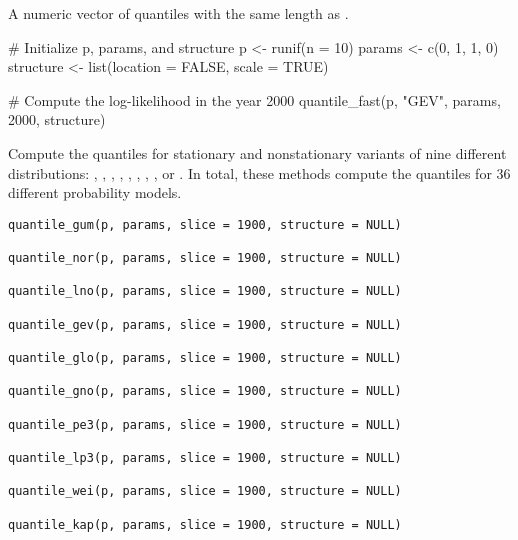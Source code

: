 \documentclass[a4paper]{book}
\begin{document}
%
\begin{Value}
A numeric vector of quantiles with the same length as .
\end{Value}
%
\begin{SeeAlso}
\end{SeeAlso}
%
\begin{Examples}
\begin{ExampleCode}
# Initialize p, params, and structure
p <- runif(n = 10)
params <- c(0, 1, 1, 0)
structure <- list(location = FALSE, scale = TRUE)

# Compute the log-likelihood in the year 2000
quantile_fast(p, "GEV", params, 2000, structure)

\end{ExampleCode}
\end{Examples}
%
\begin{Description}
Compute the quantiles for stationary and nonstationary variants of nine
different distributions: , , , , , ,
, , or . In total, these methods compute the quantiles
for 36 different probability models.
\end{Description}
%
\begin{Usage}
\begin{verbatim}
quantile_gum(p, params, slice = 1900, structure = NULL)

quantile_nor(p, params, slice = 1900, structure = NULL)

quantile_lno(p, params, slice = 1900, structure = NULL)

quantile_gev(p, params, slice = 1900, structure = NULL)

quantile_glo(p, params, slice = 1900, structure = NULL)

quantile_gno(p, params, slice = 1900, structure = NULL)

quantile_pe3(p, params, slice = 1900, structure = NULL)

quantile_lp3(p, params, slice = 1900, structure = NULL)

quantile_wei(p, params, slice = 1900, structure = NULL)

quantile_kap(p, params, slice = 1900, structure = NULL)
\end{verbatim}
\end{Usage}
\end{document}
